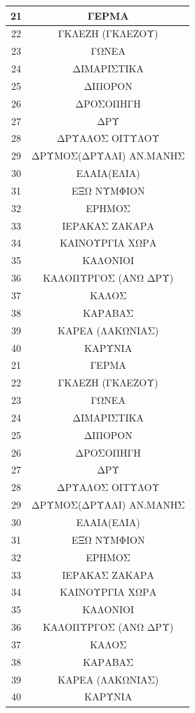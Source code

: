 \documentclass[12pt]{article}
\begin{document}
	\begin{table}[H]
		\centering
		\begin{tabular}{|c|c|}
			\hline
			21 & ΓΕΡΜΑ \\ \hline
			22 & ΓΚΛΕΖΗ  (ΓΚΛΕΖΟΥ) \\ \hline
			23 & ΓΩΝΕΑ \\ \hline
			24 & ΔΙΜΑΡΙΣΤΙΚΑ \\ \hline
			25 & ΔΙΠΟΡΟΝ \\ \hline
			26 & ΔΡΟΣΟΠΗΓΗ \\ \hline
			27 & ΔΡΥ \\ \hline
			28 & ΔΡΥΑΛΟΣ ΟΙΤΥΛΟΥ \\ \hline
			29 & ΔΡΥΜΟΣ(ΔΡΥΑΛΙ) ΑΝ.ΜΑΝΗΣ \\ \hline
			30 & ΕΛΑΙΑ(ΕΛΙΑ) \\ \hline
			31 & ΕΞΩ ΝΥΜΦΙΟΝ \\ \hline
			32 & ΕΡΗΜΟΣ \\ \hline
			33 & ΙΕΡΑΚΑΣ ΖΑΚΑΡΑ \\ \hline
			34 & ΚΑΙΝΟΥΡΓΙΑ ΧΩΡΑ \\ \hline
			35 & ΚΑΛΟΝΙΟΙ \\ \hline
			36 & ΚΑΛΟΠΥΡΓΟΣ (ΑΝΩ ΔΡΥ) \\ \hline
			37 & ΚΑΛΟΣ \\ \hline
			38 & ΚΑΡΑΒΑΣ \\ \hline
			39 & ΚΑΡΕΑ (ΛΑΚΩΝΙΑΣ) \\ \hline
			40 & ΚΑΡΥΝΙΑ \\ \hline
			21 & ΓΕΡΜΑ \\ \hline
			22 & ΓΚΛΕΖΗ  (ΓΚΛΕΖΟΥ) \\ \hline
			23 & ΓΩΝΕΑ \\ \hline
			24 & ΔΙΜΑΡΙΣΤΙΚΑ \\ \hline
			25 & ΔΙΠΟΡΟΝ \\ \hline
			26 & ΔΡΟΣΟΠΗΓΗ \\ \hline
			27 & ΔΡΥ \\ \hline
			28 & ΔΡΥΑΛΟΣ ΟΙΤΥΛΟΥ \\ \hline
			29 & ΔΡΥΜΟΣ(ΔΡΥΑΛΙ) ΑΝ.ΜΑΝΗΣ \\ \hline
			30 & ΕΛΑΙΑ(ΕΛΙΑ) \\ \hline
			31 & ΕΞΩ ΝΥΜΦΙΟΝ \\ \hline
			32 & ΕΡΗΜΟΣ \\ \hline
			33 & ΙΕΡΑΚΑΣ ΖΑΚΑΡΑ \\ \hline
			34 & ΚΑΙΝΟΥΡΓΙΑ ΧΩΡΑ \\ \hline
			35 & ΚΑΛΟΝΙΟΙ \\ \hline
			36 & ΚΑΛΟΠΥΡΓΟΣ (ΑΝΩ ΔΡΥ) \\ \hline
			37 & ΚΑΛΟΣ \\ \hline
			38 & ΚΑΡΑΒΑΣ \\ \hline
			39 & ΚΑΡΕΑ (ΛΑΚΩΝΙΑΣ) \\ \hline
			40 & ΚΑΡΥΝΙΑ \\ \hline
		\end{tabular}
	\end{table}
\end{document}
